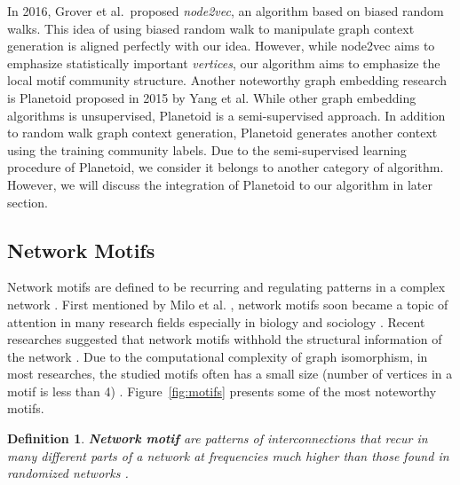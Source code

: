\documentclass[letterpaper]{article}
\newtheorem{ntdef}{Definition}
\begin{document}
            In 2016, Grover et al.\ proposed \emph{node2vec}, an algorithm based on biased random
            walks. This idea of using biased random walk to manipulate graph context generation
            is aligned perfectly with our idea. However, while node2vec aims to emphasize statistically
            important \emph{vertices}, our algorithm aims to emphasize the local motif community
            structure. Another noteworthy graph embedding research is Planetoid \cite{planetoid} 
            proposed in 2015 by Yang et al. While other graph embedding algorithms is unsupervised, 
            Planetoid is a semi-supervised approach. In addition to random walk graph context generation, 
            Planetoid generates another context using the training community labels. Due to the
            semi-supervised learning procedure of Planetoid, we consider it belongs to another
            category of algorithm. However, we will discuss the integration of Planetoid to our
            algorithm in later section.

        \subsection{Network Motifs}

            Network motifs are defined to be recurring and regulating patterns in a complex network 
            \cite{netmotif}. First mentioned by Milo et al. \cite{motifblockmilo}, network motifs
            soon became a topic of attention in many research fields especially in biology and sociology
            \cite{masoudirev}. Recent researches suggested that network motifs withhold the structural 
            information of the network \cite{juremotif, harvardmotif, deepgraphkernel}. Due to the
            computational complexity of graph isomorphism, in most researches, the studied motifs 
            often has a small size (number of vertices in a motif is less than 4) \cite{motifdecrev}.
            Figure~\ref{fig:motifs} presents some of the most noteworthy motifs.


            \begin{ntdef}
                \textbf{Network motif} are patterns of interconnections that recur in many different
                parts of a network at frequencies much higher than those found in randomized networks
                \cite{motifblockmilo}.
            \end{ntdef}
\end{document}
